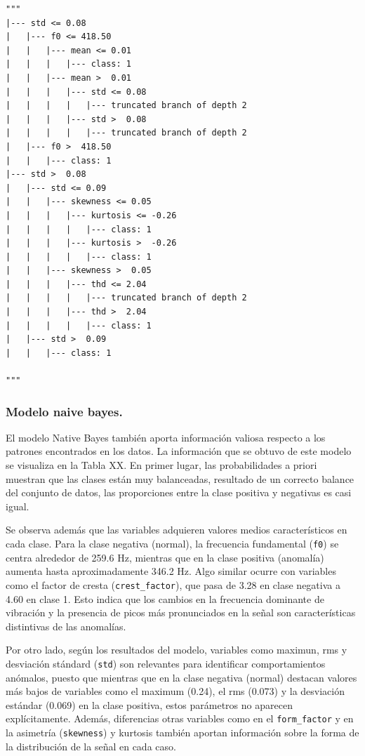 \documentclass[11pt,a4paper,spanish]{book}
\numberwithin{equation}{chapter}
\numberwithin{figure}{chapter}
\begin{document}
\begin{lstlisting}
"""
|--- std <= 0.08
|   |--- f0 <= 418.50
|   |   |--- mean <= 0.01
|   |   |   |--- class: 1
|   |   |--- mean >  0.01
|   |   |   |--- std <= 0.08
|   |   |   |   |--- truncated branch of depth 2
|   |   |   |--- std >  0.08
|   |   |   |   |--- truncated branch of depth 2
|   |--- f0 >  418.50
|   |   |--- class: 1
|--- std >  0.08
|   |--- std <= 0.09
|   |   |--- skewness <= 0.05
|   |   |   |--- kurtosis <= -0.26
|   |   |   |   |--- class: 1
|   |   |   |--- kurtosis >  -0.26
|   |   |   |   |--- class: 1
|   |   |--- skewness >  0.05
|   |   |   |--- thd <= 2.04
|   |   |   |   |--- truncated branch of depth 2
|   |   |   |--- thd >  2.04
|   |   |   |   |--- class: 1
|   |--- std >  0.09
|   |   |--- class: 1

"""
\end{lstlisting}



\subsubsection{Modelo naive bayes.}

El modelo Native Bayes también aporta información valiosa respecto a los patrones encontrados en los datos. La información que se obtuvo de  este modelo se visualiza en la Tabla XX. En primer lugar, las probabilidades a priori muestran que las clases están muy balanceadas, resultado de un correcto balance del conjunto de datos, las proporciones entre la clase positiva y negativas es casi igual. 


Se observa además que las variables adquieren valores medios característicos en cada clase. Para la clase negativa (normal), la frecuencia fundamental (\lstinline|f0|) se centra alrededor de 259.6 Hz, mientras que en la clase positiva (anomalía) aumenta hasta aproximadamente 346.2 Hz. 
Algo similar ocurre con variables como el factor de cresta (\lstinline|crest_factor|), que pasa de 3.28 en clase negativa a 4.60 en clase 1. Esto indica que los cambios en la frecuencia dominante de vibración y la  presencia de picos más pronunciados en la señal son características distintivas de las anomalías.


Por otro lado, según los resultados del modelo, variables como maximun, rms y desviación stándard (\lstinline|std|) son relevantes para identificar comportamientos anómalos, puesto que mientras que en la clase negativa (normal) destacan valores más bajos de variables como el maximum (0.24), el rms (0.073) y la desviación estándar (0.069) en la clase positiva, estos parámetros no aparecen explícitamente. Además, diferencias otras variables como en el \lstinline|form_factor| y en la asimetría (\lstinline|skewness|) y kurtosis también aportan información sobre la forma de la distribución de la señal en cada caso.
\end{document}
